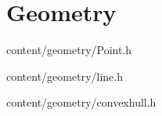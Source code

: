\section{Geometry}


{}
{content/geometry/Point.h}

{}
{content/geometry/line.h}

{}
{content/geometry/convexhull.h}
